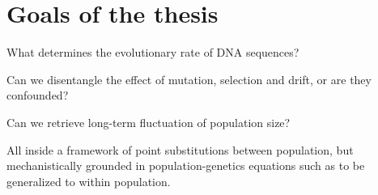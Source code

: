 \chapter{Goals of the thesis}
{
	\hypersetup{linkcolor=GREYDARK}
	\minitoc
}
\label{sec:goals}

What determines the evolutionary rate of DNA sequences?

Can we disentangle the effect of mutation, selection and drift, or are they confounded?

Can we retrieve long-term fluctuation of population size? 

All inside a framework of point substitutions between population, but mechanistically grounded in population-genetics equations such as to be generalized to within population.